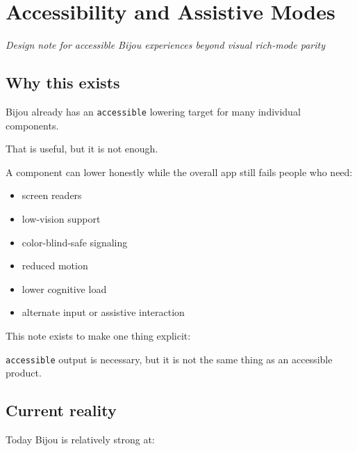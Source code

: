 \chapter{Accessibility and Assistive Modes}\label{record-032}

\smallskip

\emph{Design note for accessible Bijou experiences beyond visual rich-mode parity}

\section{Why this exists}\label{record-032-why-this-exists}

Bijou already has an \texttt{a\allowbreak{}c\allowbreak{}c\allowbreak{}e\allowbreak{}s\allowbreak{}s\allowbreak{}i\allowbreak{}b\allowbreak{}l\allowbreak{}e} lowering target for many individual components.

That is useful, but it is not enough.

A component can lower honestly while the overall app still fails people who need:

\begin{itemize}
\tightlist
\item
  screen readers
\item
  low-vision support
\item
  color-blind-safe signaling
\item
  reduced motion
\item
  lower cognitive load
\item
  alternate input or assistive interaction
\end{itemize}

This note exists to make one thing explicit:

\texttt{a\allowbreak{}c\allowbreak{}c\allowbreak{}e\allowbreak{}s\allowbreak{}s\allowbreak{}i\allowbreak{}b\allowbreak{}l\allowbreak{}e} output is necessary, but it is not the same thing as an accessible product.

\section{Current reality}\label{record-032-current-reality}

Today Bijou is relatively strong at:

